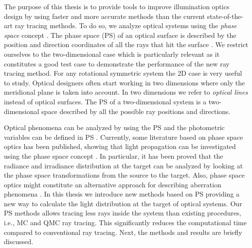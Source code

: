 The purpose of this thesis is to provide tools to improve illumination optics design by using faster and more accurate methods than the current state-of-the-art ray tracing methods.
To do so, we analyze optical systems using the \textit{phase space} concept \cite{torre2005linear}.
The phase space (PS) of an optical surface is described by the position and direction coordinates of all the rays that hit the surface \cite{testorf2009phase}. We restrict ourselves to the two-dimensional case which is particularly relevant as it constitutes a good test case to
demonstrate the performance of the new ray tracing method. For any rotational symmetric
system the 2D case is very useful to study. Optical designers often start working in two dimensions where only the
meridional plane is taken into account. In two dimensions we refer to \textit{optical lines} instead of optical surfaces. The PS of a two-dimensional system is a two-dimensional space described by all the possible ray positions and directions. 

Optical phenomena can be analyzed by using the PS and the photometric variables can be defined in PS \cite{rausch2014illumination}.  
Currently, some literature based on phase space optics has been published, showing that light propagation can be investigated using the phase space concept \cite{rausch2012phase,rausch2014phase, herkommer2012phase}. 
In particular, it has been proved that the radiance and irradiance distribution at the target can be analyzed by looking at the phase space transformations from the source to the target.
Also, phase space optics might constitute an alternative approach for describing aberration phenomena \cite{herkommer2013phase, babington2017freeform, wolf1993relativistic}. In this thesis we introduce new methods based on PS providing a new way to calculate the light distribution at the target of optical systems. Our PS methods allows tracing less rays inside the system than existing procedures, i.e., MC and QMC ray tracing. This significantly reduces the computational time compared to conventional ray tracing.
Next, the methods and results are briefly discussed. 
